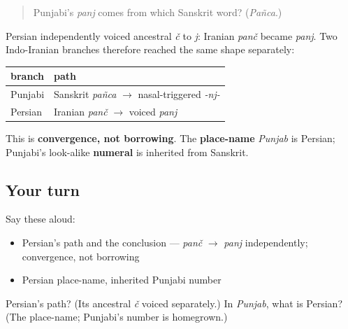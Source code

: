 \begin{quote}
Punjabi's \emph{panj} comes from which Sanskrit word? (\emph{Pañca}.)
\end{quote}

\begin{cousinweb}
Persian independently voiced ancestral \emph{č} to \emph{j}: Iranian \emph{panč} became \emph{panj}. Two Indo-Iranian branches therefore reached the same shape separately:

\noindent
\begin{tabularx}{\linewidth}{@{}>{\raggedright\arraybackslash}X>{\raggedright\arraybackslash}X@{}}
\toprule
\textbf{branch} & \textbf{path} \\
\midrule
Punjabi & Sanskrit \emph{pañca} $\to$ nasal-triggered \emph{-nj-} \\
Persian & Iranian \emph{panč} $\to$ voiced \emph{panj} \\
\bottomrule
\end{tabularx}

This is \textbf{convergence, not borrowing}. The \textbf{place-name} \emph{Punjab} is Persian; Punjabi's look-alike \textbf{numeral} is inherited from Sanskrit.
\end{cousinweb}

\subsection*{Your turn}
Say these aloud:

\begin{itemize}
\raggedright
  \item Persian's path and the conclusion — \emph{panč} $\to$ \emph{panj} independently; convergence, not borrowing
  \item Persian place-name, inherited Punjabi number
\end{itemize}

\begin{tcolorbox}[breakable,colback=teal!4,colframe=teal!35!black,title={Before you move on}]
Persian's path? (Its ancestral \emph{č} voiced separately.) In \emph{Punjab}, what is Persian? (The place-name; Punjabi's number is homegrown.)
\end{tcolorbox}
